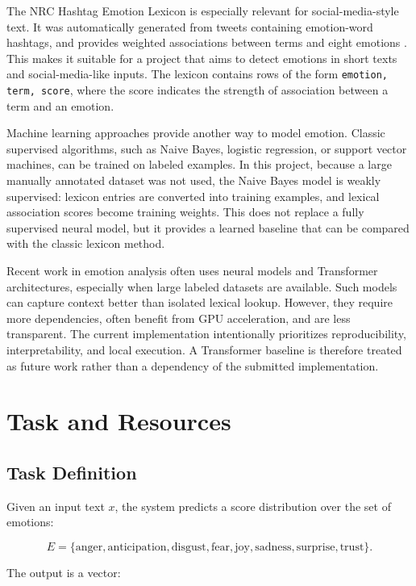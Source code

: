 \documentclass[11pt]{article}
\begin{document}
The NRC Hashtag Emotion Lexicon is especially relevant for social-media-style text. It was automatically generated from tweets containing emotion-word hashtags, and provides weighted associations between terms and eight emotions \citep{mohammad2012emotional,mohammad2015hashtags}. This makes it suitable for a project that aims to detect emotions in short texts and social-media-like inputs. The lexicon contains rows of the form \texttt{emotion, term, score}, where the score indicates the strength of association between a term and an emotion.

Machine learning approaches provide another way to model emotion. Classic supervised algorithms, such as Naive Bayes, logistic regression, or support vector machines, can be trained on labeled examples. In this project, because a large manually annotated dataset was not used, the Naive Bayes model is weakly supervised: lexicon entries are converted into training examples, and lexical association scores become training weights. This does not replace a fully supervised neural model, but it provides a learned baseline that can be compared with the classic lexicon method.

Recent work in emotion analysis often uses neural models and Transformer architectures, especially when large labeled datasets are available. Such models can capture context better than isolated lexical lookup. However, they require more dependencies, often benefit from GPU acceleration, and are less transparent. The current implementation intentionally prioritizes reproducibility, interpretability, and local execution. A Transformer baseline is therefore treated as future work rather than a dependency of the submitted implementation.

\section{Task and Resources}

\subsection{Task Definition}

Given an input text $x$, the system predicts a score distribution over the set of emotions:

\[
E = \{\text{anger}, \text{anticipation}, \text{disgust}, \text{fear}, \text{joy}, \text{sadness}, \text{surprise}, \text{trust}\}.
\]

The output is a vector:
\end{document}
